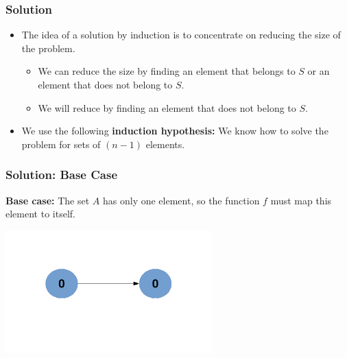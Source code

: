 \documentclass{beamer}
\begin{document}
\begin{frame}
\frametitle{Solution}

\begin{itemize}

\item The idea of a solution by induction is to concentrate on reducing the size of the problem.
\begin{itemize}
\item We can reduce the size by finding an element that belongs to $S$ or an element that does not belong to $S$.
\vspace{0.2cm}
\item We will reduce by finding an element that does not belong to $S$.
\end{itemize}
\vspace{0.5cm}
\item<2> We use the following \textbf{induction hypothesis:} We know how to solve the problem for sets of $(n - 1)$ elements.

\end{itemize}

\end{frame}

\begin{frame}[containsverbatim]
\frametitle{Solution: Base Case}

\textbf{Base case:} The set $A$ has only one element, so the function $f$ must map this element to itself.

\begin{center}
\includegraphics[width=8cm]{mappings_base_case.pdf}
\end{center}

\end{frame}
\end{document}
